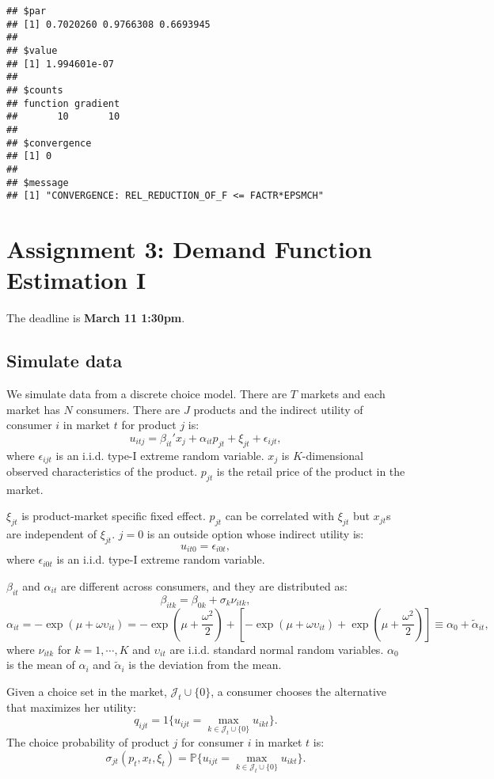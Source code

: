 \documentclass[
]{book}
\begin{document}
\begin{verbatim}
## $par
## [1] 0.7020260 0.9766308 0.6693945
## 
## $value
## [1] 1.994601e-07
## 
## $counts
## function gradient 
##       10       10 
## 
## $convergence
## [1] 0
## 
## $message
## [1] "CONVERGENCE: REL_REDUCTION_OF_F <= FACTR*EPSMCH"
\end{verbatim}

\hypertarget{assignment3}{%
\chapter{Assignment 3: Demand Function Estimation I}\label{assignment3}}

The deadline is \textbf{March 11 1:30pm}.

\hypertarget{simulate-data}{%
\section{Simulate data}\label{simulate-data}}

We simulate data from a discrete choice model. There are \(T\) markets and each market has \(N\) consumers. There are \(J\) products and the indirect utility of consumer \(i\) in market \(t\) for product \(j\) is:
\[
u_{itj} = \beta_{it}' x_j + \alpha_{it} p_{jt} + \xi_{jt} + \epsilon_{ijt},
\]
where \(\epsilon_{ijt}\) is an i.i.d. type-I extreme random variable. \(x_j\) is \(K\)-dimensional observed characteristics of the product. \(p_{jt}\) is the retail price of the product in the market.

\(\xi_{jt}\) is product-market specific fixed effect. \(p_{jt}\) can be correlated with \(\xi_{jt}\) but \(x_{jt}\)s are independent of \(\xi_{jt}\). \(j = 0\) is an outside option whose indirect utility is:
\[
u_{it0} = \epsilon_{i0t},
\]
where \(\epsilon_{i0t}\) is an i.i.d. type-I extreme random variable.

\(\beta_{it}\) and \(\alpha_{it}\) are different across consumers, and they are distributed as:
\[
\beta_{itk} = \beta_{0k} + \sigma_k \nu_{itk},
\]
\[
\alpha_{it} = - \exp(\mu + \omega \upsilon_{it}) = - \exp(\mu + \frac{\omega^2}{2}) + [- \exp(\mu + \omega \upsilon_{it}) + \exp(\mu + \frac{\omega^2}{2})] \equiv \alpha_0 + \tilde{\alpha}_{it},
\]
where \(\nu_{itk}\) for \(k = 1, \cdots, K\) and \(\upsilon_{it}\) are i.i.d. standard normal random variables. \(\alpha_0\) is the mean of \(\alpha_i\) and \(\tilde{\alpha}_i\) is the deviation from the mean.

Given a choice set in the market, \(\mathcal{J}_t \cup \{0\}\), a consumer chooses the alternative that maximizes her utility:
\[
q_{ijt} = 1\{u_{ijt} = \max_{k \in \mathcal{J}_t \cup \{0\}} u_{ikt}\}.
\]
The choice probability of product \(j\) for consumer \(i\) in market \(t\) is:
\[
\sigma_{jt}(p_t, x_t, \xi_t) = \mathbb{P}\{u_{ijt} = \max_{k \in \mathcal{J}_t \cup \{0\}} u_{ikt}\}.
\]
\end{document}
